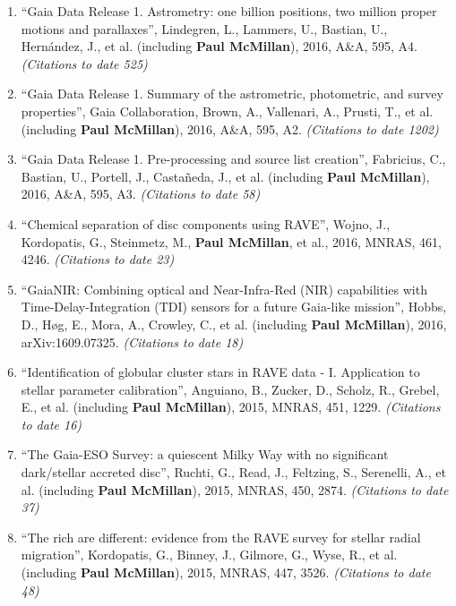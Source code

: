 \documentclass{resume}
\begin{document}
\begin{enumerate}
\item ``Gaia Data Release 1. Astrometry: one billion positions, two million proper motions and parallaxes'', Lindegren, L., Lammers, U., Bastian, U., Hern\'andez, J., et al. (including \textbf{Paul McMillan}), 2016, A\&A, 595, A4. \textit{(Citations to date 525)}

\item ``Gaia Data Release 1. Summary of the astrometric, photometric, and survey properties'', Gaia Collaboration, Brown, A., Vallenari, A., Prusti, T., et al. (including \textbf{Paul McMillan}), 2016, A\&A, 595, A2. \textit{(Citations to date 1202)}

\item ``Gaia Data Release 1. Pre-processing and source list creation'', Fabricius, C., Bastian, U., Portell, J., Casta\~neda, J., et al. (including \textbf{Paul McMillan}), 2016, A\&A, 595, A3. \textit{(Citations to date 58)}

\item ``Chemical separation of disc components using RAVE'', Wojno, J., Kordopatis, G., Steinmetz, M., \textbf{Paul McMillan}, et al., 2016, MNRAS, 461, 4246. \textit{(Citations to date 23)}

\item ``GaiaNIR: Combining optical and Near-Infra-Red (NIR) capabilities with Time-Delay-Integration (TDI) sensors for a future Gaia-like mission'', Hobbs, D., H{\o}g, E., Mora, A., Crowley, C., et al. (including \textbf{Paul McMillan}), 2016, arXiv:1609.07325. \textit{(Citations to date 18)}

\item ``Identification of globular cluster stars in RAVE data - I. Application to stellar parameter calibration'', Anguiano, B., Zucker, D., Scholz, R., Grebel, E., et al. (including \textbf{Paul McMillan}), 2015, MNRAS, 451, 1229. \textit{(Citations to date 16)}

\item ``The Gaia-ESO Survey: a quiescent Milky Way with no significant dark/stellar accreted disc'', Ruchti, G., Read, J., Feltzing, S., Serenelli, A., et al. (including \textbf{Paul McMillan}), 2015, MNRAS, 450, 2874. \textit{(Citations to date 37)}

\item ``The rich are different: evidence from the RAVE survey for stellar radial migration'', Kordopatis, G., Binney, J., Gilmore, G., Wyse, R., et al. (including \textbf{Paul McMillan}), 2015, MNRAS, 447, 3526. \textit{(Citations to date 48)}


\end{enumerate}
\end{document}

